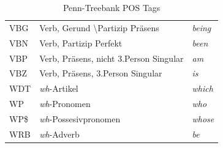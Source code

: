 \begin{table}
\begin{tabular}{ | l l l |}
	VBG & Verb, Gerund \textbackslash Partizip Präsens & \textit{being} \\
	VBN & Verb, Partizip Perfekt & \textit{been} \\
	VBP & Verb, Präsens, nicht 3.Person Singular & \textit{am}  \\
	VBZ & Verb, Präsens, 3.Person Singular & \textit{is} \\
	WDT & \textit{wh}-Artikel & \textit{which} \\
	WP & \textit{wh}-Pronomen & \textit{who} \\
	WP\$ & \textit{wh}-Possesivpronomen & \textit{whose} \\
	WRB & \textit{wh}-Adverb & \textit{be} \\
	\hline
\end{tabular}
\caption{Penn-Treebank POS Tags \cite{ptbInformationen}} %
\label{tab:pos-tags}
\end{table}

